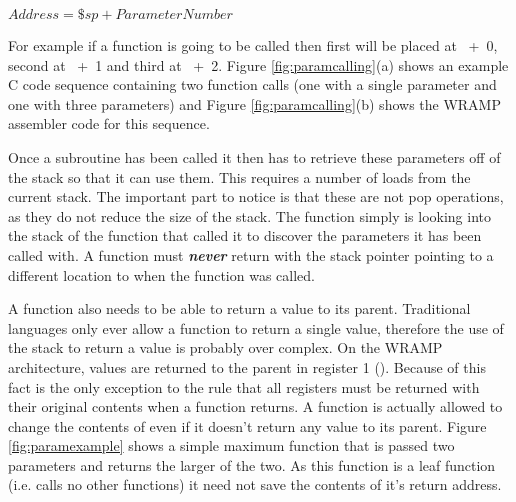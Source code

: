 \begin{center}
$Address = \$sp + ParameterNumber$\\
\end{center}

For example if a function  is going to
be called then first will be placed at \mbox{ + 0}, second
at \mbox{ + 1} and third at \mbox{ + 2}.  Figure
\ref{fig:paramcalling}(a) shows an example C code sequence containing two
function calls (one with a single parameter and one with three
parameters) and Figure \ref{fig:paramcalling}(b) shows the WRAMP
assembler code for this sequence.

Once a subroutine has been called it then has to retrieve these
parameters off of the stack so that it can use them. This requires a
number of loads from the current stack. The important part to notice
is that these are not pop operations, as they do not reduce the size
of the stack. The function simply is looking into the stack of the
function that called it to discover the parameters it has been called
with. A function must \textbf{\emph{never}} return with the stack
pointer pointing to a different location to when the function was
called.

A function also needs to be able to return a value to its
parent. Traditional languages only ever allow a function to return a
single value, therefore the use of the stack to return a value is
probably over complex. On the WRAMP architecture, values are returned
to the parent in register 1 (). Because of this fact
 is the only exception to the rule that all registers must be
returned with their original contents when a function returns. A
function is actually allowed to change the contents of  even
if it doesn't return any value to its parent. Figure
\ref{fig:paramexample} shows a simple maximum function that is passed
two parameters and returns the larger of the two. As this function is
a leaf function (i.e. calls no other functions) it need not save the
contents of it's return address.

